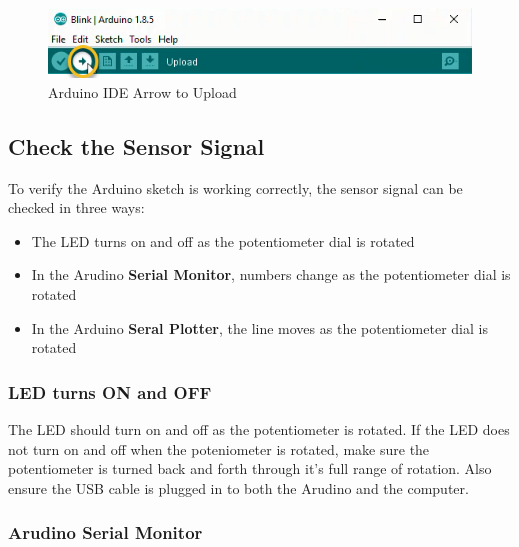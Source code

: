 \documentclass{book}
\makeatletter
\def\maxwidth{\ifdim\Gin@nat@width>\linewidth\linewidth
    \else\Gin@nat@width\fi}
\let\Oldincludegraphics\includegraphics
\renewcommand{\includegraphics}[1]{\Oldincludegraphics[width=.8\maxwidth]{#1}}
\providecommand{\tightlist}{%
      \setlength{\itemsep}{0pt}\setlength{\parskip}{0pt}}
\makeatother
\begin{document}
\begin{figure}
\centering
\includegraphics{images/Arrow_to_Upload.png}
\caption{Arduino IDE Arrow to Upload}
\end{figure}
    




    
        \subsection{Check the Sensor Signal}\label{check-the-sensor-signal}
    




    
        To verify the Arduino sketch is working correctly, the sensor signal can
be checked in three ways:

\begin{itemize}
\tightlist
\item
  The LED turns on and off as the potentiometer dial is rotated
\item
  In the Arudino \textbf{Serial Monitor}, numbers change as the
  potentiometer dial is rotated
\item
  In the Arduino \textbf{Seral Plotter}, the line moves as the
  potentiometer dial is rotated
\end{itemize}
    




    
        \subsubsection{LED turns ON and OFF}\label{led-turns-on-and-off}

The LED should turn on and off as the potentiometer is rotated. If the
LED does not turn on and off when the poteniometer is rotated, make sure
the potentiometer is turned back and forth through it's full range of
rotation. Also ensure the USB cable is plugged in to both the Arudino
and the computer.
    




    
        \subsubsection{Arudino Serial Monitor}\label{arudino-serial-monitor}
\end{document}
